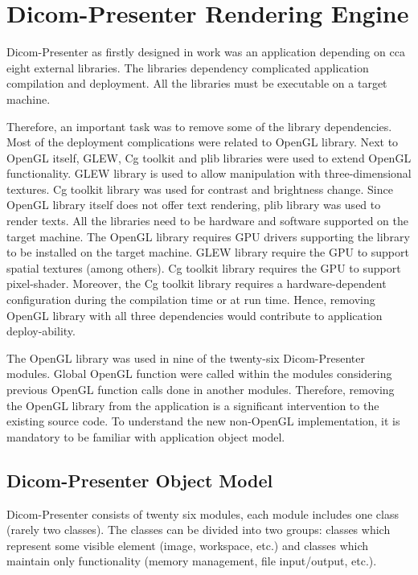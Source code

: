 \chapter{Dicom-Presenter Rendering Engine}
\label{noOpenGL}
\vspace{-10mm}
Dicom-Presenter as firstly designed in work \cite{neskudla} was an application depending on cca eight external libraries. The libraries dependency complicated application compilation and deployment. All the libraries must be executable on a target machine.

Therefore, an important task was to remove some of the library dependencies. Most of the deployment complications were related to OpenGL library. Next to OpenGL itself, GLEW, Cg toolkit and plib libraries were used to extend OpenGL functionality. GLEW library is used to allow manipulation with three-dimensional textures. Cg toolkit library was used for contrast and brightness change. Since OpenGL library itself does not offer text rendering, plib library was used to render texts. All the libraries need to be hardware and software supported on the target machine. The OpenGL library requires GPU drivers supporting the library to be installed on the target machine\cite[page 715]{OpenGLhardwaresupport}. GLEW library require the GPU to support spatial textures (among others). Cg toolkit library requires the GPU to support pixel-shader\cite[page~5]{cgtoolkitsupport}. Moreover, the Cg toolkit library requires a hardware-dependent configuration during the compilation time or at run time. Hence, removing OpenGL library with all three dependencies would contribute to application deploy-ability.

The OpenGL library was used in nine of the twenty-six Dicom-Presenter modules. Global OpenGL function were called within the modules considering previous OpenGL function calls done in another modules. Therefore, removing the OpenGL library from the application is a significant intervention to the existing source code. To understand the new non-OpenGL implementation, it is mandatory to be familiar with application object model.

\section{Dicom-Presenter Object Model}
\label{dpobjectmodel}
Dicom-Presenter consists of twenty six modules, each module includes one class (rarely two classes). The classes can be divided into two groups: classes which represent some visible element (image, workspace, etc.) and classes which maintain only functionality (memory management, file input/output, etc.).

